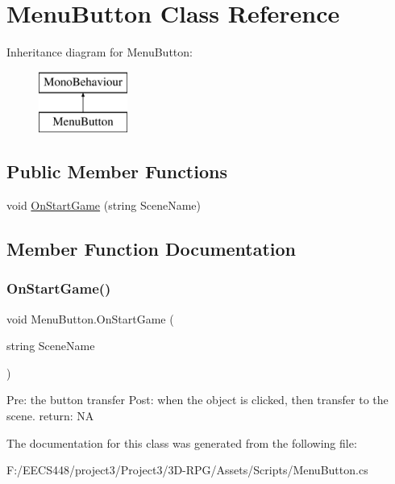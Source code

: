 \hypertarget{class_menu_button}{}\section{Menu\+Button Class Reference}
\label{class_menu_button}
Inheritance diagram for Menu\+Button\+:\begin{figure}[H]
\begin{center}
\leavevmode
\includegraphics[height=2.000000cm]{class_menu_button}
\end{center}
\end{figure}
\subsection*{Public Member Functions}
\begin{DoxyCompactItemize}
\item 
void \hyperlink{class_menu_button_a71618b5e4b14e257dfcd53655e11d0ac}{On\+Start\+Game} (string Scene\+Name)
\end{DoxyCompactItemize}


\subsection{Member Function Documentation}
\mbox{\label{class_menu_button_a71618b5e4b14e257dfcd53655e11d0ac}} 
\subsubsection{\texorpdfstring{On\+Start\+Game()}{OnStartGame()}}
{\footnotesize\ttfamily void Menu\+Button.\+On\+Start\+Game (\begin{DoxyParamCaption}\item[{string}]{Scene\+Name }\end{DoxyParamCaption})}

Pre\+: the button transfer Post\+: when the object is clicked, then transfer to the scene. return\+: NA 

The documentation for this class was generated from the following file\+:\begin{DoxyCompactItemize}
\item 
F\+:/\+E\+E\+C\+S448/project3/\+Project3/3\+D-\/\+R\+P\+G/\+Assets/\+Scripts/Menu\+Button.\+cs\end{DoxyCompactItemize}
